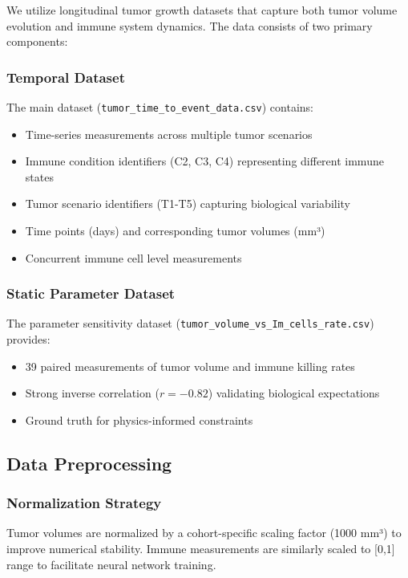\documentclass{juliacon}
\begin{document}
We utilize longitudinal tumor growth datasets that capture both tumor volume evolution and immune system dynamics. The data consists of two primary components:

\subsubsection{Temporal Dataset}
The main dataset (\texttt{tumor\_time\_to\_event\_data.csv}) contains:
\begin{itemize}
    \item Time-series measurements across multiple tumor scenarios
    \item Immune condition identifiers (C2, C3, C4) representing different immune states
    \item Tumor scenario identifiers (T1-T5) capturing biological variability
    \item Time points (days) and corresponding tumor volumes (mm³)
    \item Concurrent immune cell level measurements
\end{itemize}

\subsubsection{Static Parameter Dataset}
The parameter sensitivity dataset (\texttt{tumor\_volume\_vs\_Im\_cells\_rate.csv}) provides:
\begin{itemize}
    \item 39 paired measurements of tumor volume and immune killing rates
    \item Strong inverse correlation ($r = -0.82$) validating biological expectations
    \item Ground truth for physics-informed constraints
\end{itemize}

\subsection{Data Preprocessing}

\subsubsection{Normalization Strategy}
Tumor volumes are normalized by a cohort-specific scaling factor (1000 mm³) to improve numerical stability. Immune measurements are similarly scaled to [0,1] range to facilitate neural network training.
\end{document}
